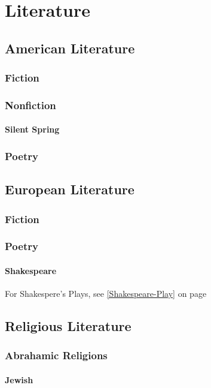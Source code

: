 \chapter{Literature}
	\section{American Literature}
		\subsection{Fiction}
		\subsection{Nonfiction}
			\subsubsection{Silent Spring}
		\subsection{Poetry}

			

		
	\section{European Literature}
		\subsection{Fiction}
		\subsection{Poetry}
		\subsubsection{Shakespeare} \label{Shakespeare-Poetry} For Shakespere's Plays, see \ref{Shakespeare-Play} on page \pageref{Shakespeare-Play}
		
	\newpage
	\section{Religious Literature}
		\subsection{Abrahamic Religions}
			\subsubsection{Jewish}
